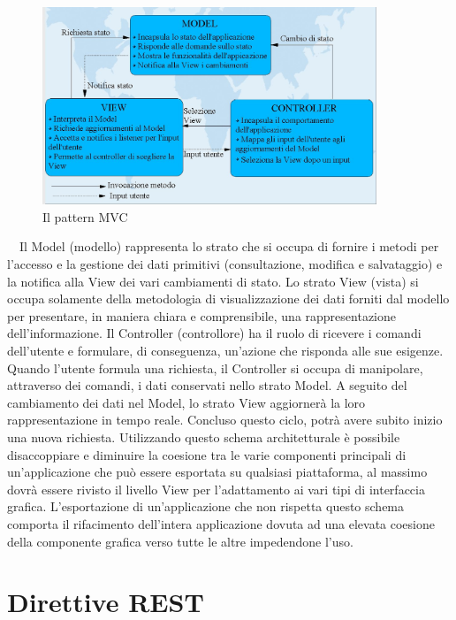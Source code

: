 \begin{figure}[htbp]
\begin{center}
\includegraphics[width=10cm]{contents/images/mvc}
\end{center}
\caption{Il pattern MVC}
\label{fig:mvc}
\end{figure}
  
Il Model (modello) rappresenta lo strato che si occupa di fornire i metodi per l’accesso e la gestione dei dati primitivi (consultazione, modifica e salvataggio)  e la notifica alla View dei vari cambiamenti di stato.
Lo strato View (vista) si occupa solamente della metodologia di visualizzazione dei dati forniti dal modello per presentare, in maniera chiara e comprensibile, una rappresentazione dell’informazione.
Il Controller (controllore) ha il ruolo di ricevere i comandi dell’utente e formulare, di conseguenza, un’azione che risponda alle sue esigenze.
Quando l’utente formula una richiesta, il Controller si occupa di manipolare, attraverso dei comandi, i dati conservati nello strato Model. A seguito del cambiamento dei dati nel Model, lo strato View aggiornerà la loro rappresentazione in tempo reale. Concluso questo ciclo, potrà avere subito inizio una nuova richiesta. 
Utilizzando questo schema architetturale è possibile disaccoppiare e diminuire la coesione tra le varie componenti principali di un’applicazione che può essere esportata su qualsiasi piattaforma, al massimo dovrà essere rivisto il livello View per l’adattamento ai vari tipi di interfaccia grafica. 
L’esportazione di un’applicazione che non rispetta questo schema comporta il rifacimento dell’intera applicazione dovuta ad una elevata coesione della componente grafica verso tutte le altre impedendone l’uso. 

\section{Direttive REST} %
\label{sec:direttive_rest}

